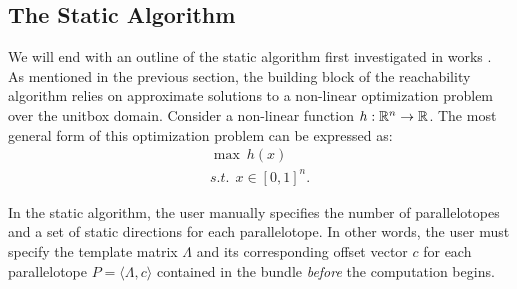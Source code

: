 \subsection{The Static Algorithm}
\label{sec:static}

We will end with an outline of the static algorithm first investigated in works \cite{dang2012reachability, dreossi2016parallelotope}. As mentioned in the previous section, the building block of the reachability algorithm relies on approximate solutions to a non-linear optimization problem over the unitbox domain. Consider a non-linear function $h : {\mathbb{R}}^n \rightarrow {\mathbb{R}}$. The most general form of this optimization problem can be expressed as:
%
\begin{eqnarray}
  \max ~ h(x) \label{eq:maxsup}\\
  s.t. ~~ x \in [0,1]^{n}.\nonumber
\end{eqnarray}

In the static algorithm, the user manually specifies the number of parallelotopes and a set of static directions for each parallelotope. In other words, the user must specify the template matrix $\Lambda$ and its corresponding offset vector $c$ for each parallelotope $P = \langle \Lambda, c\rangle$ contained in the bundle \emph{before} the computation begins.

